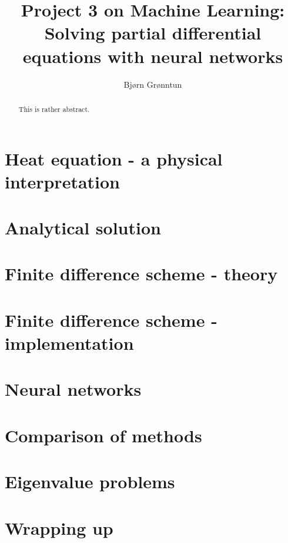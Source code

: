 \documentclass{article}
\title{Project 3 on Machine Learning: Solving partial differential equations with neural networks}
\author{Bj{\o}rn Gr{\o}nntun}
\begin{document}
\maketitle

\begin{abstract}
    This is rather abstract.
\end{abstract}

\section{Heat equation - a physical interpretation}

\section{Analytical solution}

\section{Finite difference scheme - theory}

\section{Finite difference scheme - implementation}

\section{Neural networks}

\section{Comparison of methods}

\section{Eigenvalue problems}

\section{Wrapping up}
\end{document}

